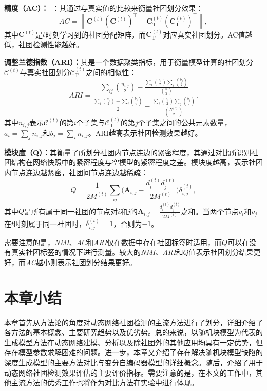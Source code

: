 \textbf{精度（AC）：}~\cite{folino2013evolutionary}：其通过与真实值的比较来衡量社团划分效果：
     \begin{equation}
       AC = \left \| \mathbf{C}^{(t)}(\mathbf{C}^{(t)})^{\top}-\mathbf{C}_{\mathrm{T}}^{(t)}(\mathbf{C}_{\mathrm{T}}^{(t)})^{\top} \right \|,
      \end{equation}
其中$\mathbf{C}^{(t)}$是$t$时刻学习到的社团分配矩阵，而$\mathbf{C}_{\mathrm{T}}^{(t)}$对应真实社团划分。AC值越低，社团检测性能越好。

\textbf{调整兰德指数（ARI）：}其是一个数据聚类指标，用于衡量模型计算的社团划分$\mathcal{C}^{(t)}$与真实社团划分$\mathcal{C}_{\mathrm{T}}^{(t)}$之间的相似性：
     \begin{equation}
      ARI = \dfrac{\sum_{ij}\binom{n_{i,j}}{2}-
      \frac{\sum_{i}\binom{a_{i}}{2} \sum_{j}\binom{b_{j}}{2}}{\binom{n}{2}}}{\frac{ \sum_{i}\binom{a_{i}}{2}+ \sum_{j}\binom{b_{j}}{2} }{2}-\frac{\sum_{i}\binom{a_{i}}{2} \sum_{j}\binom{b_{j}}{2}}{\binom{N^{(t)}}{2}}}.
      \end{equation}
其中$n_{i,j}$表示$\mathcal{C}^{(t)}$的第$i$个子集与$\mathcal{C}_{\mathrm{T}}^{(t)}$的第$j$个子集之间的公共元素数量，$a_i = \sum_{j}n_{i,j}$和$b_j = \sum_{i}n_{i,j}$。ARI越高表示社团检测效果越好。

\textbf{模块度（Q）：}其衡量了所划分社团内节点连边的紧密程度，其通过对比所识别社团结构在网络快照中的紧密程度与空模型的紧密程度之差。模块度越高，表示社团内节点连边越紧密，社团间节点连边越稀疏：
     \begin{equation}
       Q = \frac{1}{2M^{(t)}}\sum_{ij}\bigg( \mathbf{A}_{i,j}-\frac{d_{i}^{(t)}d_{j}^{(t)}}{2M^{(t)}} \bigg)\delta_{i,j}^{(t)},
      \end{equation}
其中$Q$是所有属于同一社团的节点对$i$和$j$的$ \mathbf{A}_{i,j}-\frac{d_{i}^{(t)}d_{j}^{(t)}}{2M^{(t)}}$之和。当两个节点$v_i$和$v_j$在$t$时刻属于同一社团时，$\delta_{i,j}^{(t)}=1$，否则为$-1$。

需要注意的是，\emph{NMI}、\emph{AC}和\emph{ARI}仅在数据中存在社团标签时适用，而$Q$可以在没有真实社团标签的情况下进行测量。较大的\emph{NMI}、\emph{ARI}和$Q$值表示社团划分结果更好，而\emph{AC}越小则表示社团划分结果更好。

\section{本章小结}
本章首先从方法论的角度对动态网络社团检测的主流方法进行了划分，详细介绍了各方法的基本概念、主要研究趋势以及优劣势。总的来说，以随机块模型为代表的生成模型方法在动态网络建模、分析以及除社团外的其他应用均具有一定优势，但存在模型参数求解困难的问题。进一步，本章又介绍了存在解决随机块模型缺陷的深度生成模型的主要方法对比与变分自编码器模型的详细概念。随后，介绍了用于动态网络社团检测效果评估的主要评价指标。需要注意的是，在本文的工作中，其他主流方法的优秀工作也将作为对比方法在实验中进行体现。

